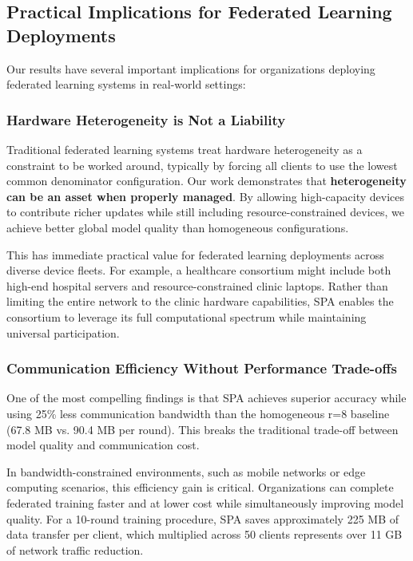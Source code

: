 \documentclass[conference]{IEEEtran}
\begin{document}
\subsection{Practical Implications for Federated Learning Deployments}

Our results have several important implications for organizations deploying federated learning systems in real-world settings:

\subsubsection{Hardware Heterogeneity is Not a Liability}

Traditional federated learning systems treat hardware heterogeneity as a constraint to be worked around, typically by forcing all clients to use the lowest common denominator configuration. Our work demonstrates that \textbf{heterogeneity can be an asset when properly managed}. By allowing high-capacity devices to contribute richer updates while still including resource-constrained devices, we achieve better global model quality than homogeneous configurations.

This has immediate practical value for federated learning deployments across diverse device fleets. For example, a healthcare consortium might include both high-end hospital servers and resource-constrained clinic laptops. Rather than limiting the entire network to the clinic hardware capabilities, SPA enables the consortium to leverage its full computational spectrum while maintaining universal participation.

\subsubsection{Communication Efficiency Without Performance Trade-offs}

One of the most compelling findings is that SPA achieves superior accuracy while using 25\% less communication bandwidth than the homogeneous r=8 baseline (67.8 MB vs. 90.4 MB per round). This breaks the traditional trade-off between model quality and communication cost.

In bandwidth-constrained environments, such as mobile networks or edge computing scenarios, this efficiency gain is critical. Organizations can complete federated training faster and at lower cost while simultaneously improving model quality. For a 10-round training procedure, SPA saves approximately 225 MB of data transfer per client, which multiplied across 50 clients represents over 11 GB of network traffic reduction.
\end{document}
